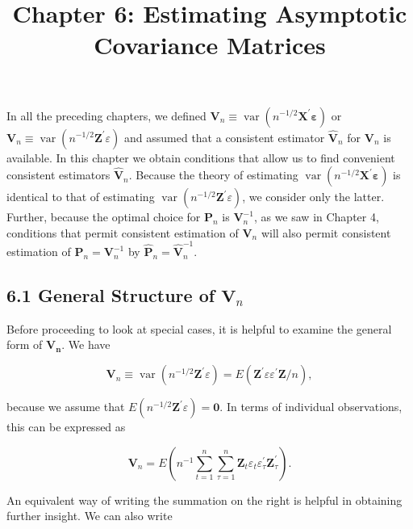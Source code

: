 \documentclass[10pt]{article}
\title{Chapter 6: Estimating Asymptotic Covariance Matrices}
\author{}
\date{}
\begin{document}
\maketitle

In all the preceding chapters, we defined $\mathbf{V}_{n} \equiv \operatorname{var}\left(n^{-1 / 2} \mathbf{X}^{\prime} \boldsymbol{\varepsilon}\right)$ or $\mathbf{V}_{n} \equiv \operatorname{var}\left(n^{-1 / 2} \mathbf{Z}^{\prime} \varepsilon\right)$ and assumed that a consistent estimator $\hat{\mathbf{V}}_{n}$ for $\mathbf{V}_{n}$ is available. In this chapter we obtain conditions that allow us to find convenient consistent estimators $\hat{\mathbf{V}}_{n}$. Because the theory of estimating $\operatorname{var}\left(n^{-1 / 2} \mathbf{X}^{\prime} \boldsymbol{\varepsilon}\right)$ is identical to that of estimating $\operatorname{var}\left(n^{-1 / 2} \mathbf{Z}^{\prime} \varepsilon\right)$, we consider only the latter. Further, because the optimal choice for $\mathbf{P}_{n}$ is $\mathbf{V}_{n}^{-1}$, as we saw in Chapter 4, conditions that permit consistent estimation of $\mathbf{V}_{n}$ will also permit consistent estimation of $\mathbf{P}_{n}=\mathbf{V}_{n}^{-1}$ by $\hat{\mathbf{P}}_{n}=\hat{\mathbf{V}}_{n}^{-1}$.

\subsection*{6.1 General Structure of $\mathbf{V}_{n}$}
Before proceeding to look at special cases, it is helpful to examine the general form of $\mathbf{V}_{\boldsymbol{n}}$. We have

$$
\mathbf{V}_{n} \equiv \operatorname{var}\left(n^{-1 / 2} \mathbf{Z}^{\prime} \varepsilon\right)=E\left(\mathbf{Z}^{\prime} \varepsilon \varepsilon^{\prime} \mathbf{Z} / n\right),
$$

because we assume that $E\left(n^{-1 / 2} \mathbf{Z}^{\prime} \varepsilon\right)=\mathbf{0}$. In terms of individual observations, this can be expressed as

$$
\mathbf{V}_{n}=E\left(n^{-1} \sum_{t=1}^{n} \sum_{\tau=1}^{n} \mathbf{Z}_{t} \varepsilon_{t} \varepsilon_{\tau}^{\prime} \mathbf{Z}_{\tau}^{\prime}\right) .
$$

An equivalent way of writing the summation on the right is helpful in obtaining further insight. We can also write
\end{document}

